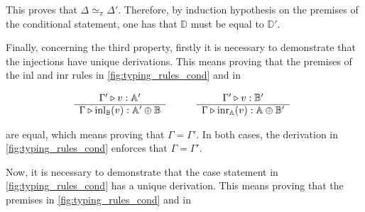 This proves that $\Delta \simeq_{\pi} \Delta'$. Therefore, by induction hypothesis on the premises of the conditional statement, one has that $\mathbb{D}$ must be equal to $\mathbb{D}'$.
  


Finally, concerning the third property, firstly it is necessary to demonstrate that the injections have unique derivations. This means proving that the premises of the inl and inr rules in \autoref{fig:typing_rules_cond} and in
\begin{figure} [H]
  \begin{equation*}
  \begin{split}
  \begin{aligned}
  & \hspace{15pt}
  \begin{minipage}[t]{0.3\textwidth}
  $\begin{array}{c}
     \Gamma' \triangleright v: \mathbb{A'} \\
    \hline
   \Gamma \triangleright \text{inl}_{\mathbb{B}}(v):  \mathbb{A'} \oplus \mathbb{B}
\end{array}
$
  \end{minipage} 
 \hspace{20pt}
\begin{minipage}[t]{0.3\textwidth}
$\begin{array}{c}
      \Gamma' \triangleright v:  \mathbb{B'} \\
    \hline
   \Gamma \triangleright \text{inr}_{\mathbb{A}}(v): \mathbb{A} \oplus \mathbb{B'}
\end{array}
$ \end{minipage}
  \end{aligned}
  \end{split}
  \end{equation*}
  \end{figure}

are equal, which means proving that $\Gamma = \Gamma'$. In both cases, the derivation in \autoref{fig:typing_rules_cond} enforces that $\Gamma = \Gamma'$.

Now, it is necessary to demonstrate that the case statement in \autoref{fig:typing_rules_cond} has a unique derivation. This means proving that the premises in \autoref{fig:typing_rules_cond} and in

